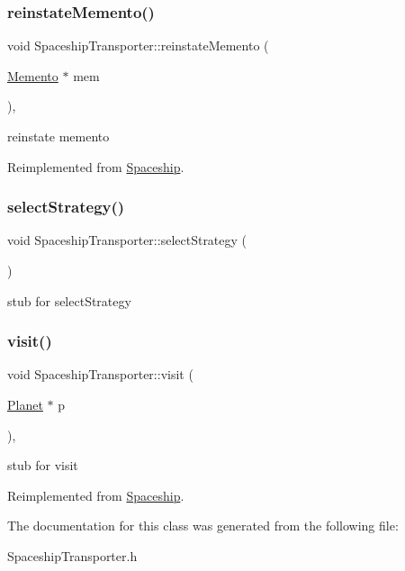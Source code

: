 \subsubsection{\texorpdfstring{reinstate\+Memento()}{reinstateMemento()}}
{\footnotesize\ttfamily void Spaceship\+Transporter\+::reinstate\+Memento (\begin{DoxyParamCaption}\item[{\hyperlink{classMemento}{Memento} $\ast$}]{mem }\end{DoxyParamCaption})\hspace{0.3cm}{\ttfamily [inline]}, {\ttfamily [virtual]}}

reinstate memento 

Reimplemented from \hyperlink{classSpaceship_ab075c869473344b6471c8e28ca7ea61e}{Spaceship}.

\mbox{\label{classSpaceshipTransporter_a4106704a6ce41243c93594d7f492f33a}} 
\subsubsection{\texorpdfstring{select\+Strategy()}{selectStrategy()}}
{\footnotesize\ttfamily void Spaceship\+Transporter\+::select\+Strategy (\begin{DoxyParamCaption}{ }\end{DoxyParamCaption})\hspace{0.3cm}{\ttfamily [inline]}}

stub for select\+Strategy \mbox{\label{classSpaceshipTransporter_a03c84b4f53adb249e915158901cfef28}} 
\subsubsection{\texorpdfstring{visit()}{visit()}}
{\footnotesize\ttfamily void Spaceship\+Transporter\+::visit (\begin{DoxyParamCaption}\item[{\hyperlink{classPlanet}{Planet} $\ast$}]{p }\end{DoxyParamCaption})\hspace{0.3cm}{\ttfamily [inline]}, {\ttfamily [virtual]}}

stub for visit 

Reimplemented from \hyperlink{classSpaceship}{Spaceship}.



The documentation for this class was generated from the following file\+:\begin{DoxyCompactItemize}
\item 
Spaceship\+Transporter.\+h\end{DoxyCompactItemize}

